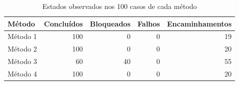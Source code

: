 \begin{table}[htbp]
\centering
\small
\caption{Estados observados nos 100 casos de cada método}
\label{tab:estados_atuais}
\begin{tabular}{lrrrr}
\hline
Método & Concluídos & Bloqueados & Falhos & Encaminhamentos \\
\hline
Método 1 & 100 & 0 & 0 & 19 \\
Método 2 & 100 & 0 & 0 & 20 \\
Método 3 & 60 & 40 & 0 & 55 \\
Método 4 & 100 & 0 & 0 & 20 \\
\hline
\end{tabular}
\end{table}
